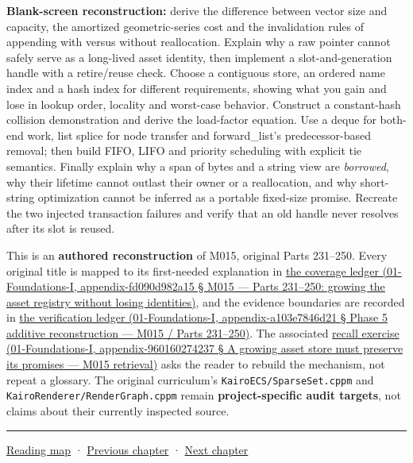 \textbf{Blank-screen reconstruction:} derive the difference between vector size and capacity, the amortized geometric-series cost and the invalidation rules of appending with versus without reallocation. Explain why a raw pointer cannot safely serve as a long-lived asset identity, then implement a slot-and-generation handle with a retire/reuse check. Choose a contiguous store, an ordered name index and a hash index for different requirements, showing what you gain and lose in lookup order, locality and worst-case behavior. Construct a constant-hash collision demonstration and derive the load-factor equation. Use a deque for both-end work, list splice for node transfer and forward\_list's predecessor-based removal; then build FIFO, LIFO and priority scheduling with explicit tie semantics. Finally explain why a span of bytes and a string view are \emph{borrowed}, why their lifetime cannot outlast their owner or a reallocation, and why short-string optimization cannot be inferred as a portable fixed-size promise. Recreate the two injected transaction failures and verify that an old handle never resolves after its slot is reused.

This is an \textbf{authored reconstruction} of M015, original Parts 231--250. Every original title is mapped to its first-needed explanation in \href{}{the coverage ledger (01-Foundations-I, appendix-fd090d982a15 § M015 --- Parts 231--250: growing the asset registry without losing identities)}, and the evidence boundaries are recorded in \href{}{the verification ledger (01-Foundations-I, appendix-a103e7846d21 § Phase 5 additive reconstruction --- M015 / Parts 231--250)}. The associated \href{}{recall exercise (01-Foundations-I, appendix-960160274237 § A growing asset store must preserve its promises --- M015 retrieval)} asks the reader to rebuild the mechanism, not repeat a glossary. The original curriculum's \texttt{KairoECS/SparseSet.cppm} and \texttt{KairoRenderer/RenderGraph.cppm} remain \textbf{project-specific audit targets}, not claims about their currently inspected source.

\begin{center}\rule{0.5\linewidth}{0.5pt}\end{center}

\href{Chapter\%20Edition/03\%20-\%20Game\%20Engine/00\%20-\%20Reading\%20Map}{Reading map} · \hyperref[05-engine-i-ch004]{Previous chapter} · \hyperref[05-engine-i-ch006]{Next chapter}
